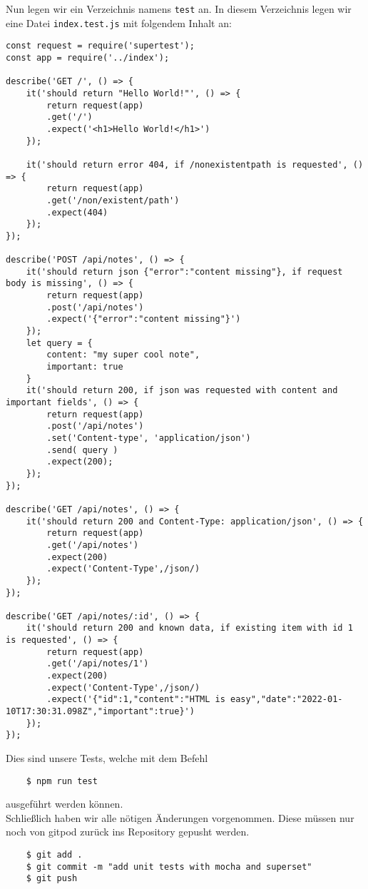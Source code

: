 \noindent
Nun legen wir ein Verzeichnis namens \verb|test| an.
In diesem Verzeichnis legen wir eine Datei \verb|index.test.js| 
mit folgendem Inhalt an:

\begin{verbatim}
const request = require('supertest');
const app = require('../index');

describe('GET /', () => {
	it('should return "Hello World!"', () => {
		return request(app)
		.get('/')
		.expect('<h1>Hello World!</h1>')
	});
	
	it('should return error 404, if /nonexistentpath is requested', () => {
		return request(app)
		.get('/non/existent/path')
		.expect(404)
	});
});

describe('POST /api/notes', () => {
	it('should return json {"error":"content missing"}, if request body is missing', () => {
		return request(app)
		.post('/api/notes')
		.expect('{"error":"content missing"}')
	});
	let query = {
		content: "my super cool note",
		important: true
	}
	it('should return 200, if json was requested with content and important fields', () => {
		return request(app)
		.post('/api/notes')
		.set('Content-type', 'application/json')
		.send( query )
		.expect(200);
	});
});

describe('GET /api/notes', () => {
	it('should return 200 and Content-Type: application/json', () => {
		return request(app)
		.get('/api/notes')
		.expect(200)
		.expect('Content-Type',/json/)
	});
});

describe('GET /api/notes/:id', () => {
	it('should return 200 and known data, if existing item with id 1 is requested', () => {
		return request(app)
		.get('/api/notes/1')
		.expect(200)
		.expect('Content-Type',/json/)
		.expect('{"id":1,"content":"HTML is easy","date":"2022-01-10T17:30:31.098Z","important":true}')
	});
});
\end{verbatim}

\noindent
Dies sind unsere Tests, welche mit dem Befehl

\begin{verbatim}
	$ npm run test
\end{verbatim}

\noindent
ausgeführt werden können. \\

\noindent
Schließlich haben wir alle nötigen Änderungen vorgenommen.
Diese müssen nur noch von gitpod zurück ins Repository gepusht werden.

\begin{verbatim}
	$ git add .
	$ git commit -m "add unit tests with mocha and superset"
	$ git push
\end{verbatim}


